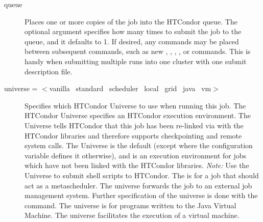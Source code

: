 \begin{description}

\label{man-condor-submit-queue}
\item[queue \oOptnm{number-of-procs}] Places one or more
copies of the job into the HTCondor queue.
The optional
argument  specifies how many times to submit the
job to the queue, and it defaults to 1.
If desired, any commands may be placed
between subsequent  commands, such as new ,
, , ,
or  commands.
This is handy when submitting multiple runs into one cluster with
one submit description file.


\label{man-condor-submit-universe}
\item[universe = $<$vanilla \Bar\ standard \Bar\ scheduler
\Bar\ local \Bar\ grid \Bar\ java \Bar\ vm$>$]
Specifies which HTCondor Universe to use when running this job.  The HTCondor
Universe specifies an HTCondor execution environment.
The  Universe tells HTCondor that this job has been
re-linked via  with the HTCondor libraries and therefore
supports checkpointing and remote system calls.
The  Universe is the default (except where the
configuration variable  defines it
otherwise), and is an execution environment for jobs which have not
been linked with the HTCondor libraries.  \emph{Note:} Use the
 Universe to submit shell scripts to HTCondor.
The  is for a job that
should act as a metascheduler.
The  universe forwards the job to an external job
management system.
Further specification of the  universe is done with the
 command.
The  universe is for programs written to the Java Virtual Machine.
The  universe facilitates the execution of a virtual
machine.

\end{description} 


